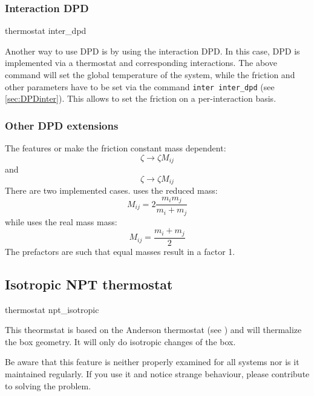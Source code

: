 \subsubsection{Interaction DPD}\label{sec:interDPD}

\begin{essyntax}
  thermostat inter_dpd 
  \begin{features}
  \end{features}
\end{essyntax}

Another way to use DPD is by using the interaction DPD. In this case,
DPD is implemented via a thermostat and corresponding interactions.
The above command will set the global temperature of the system, while
the friction and other parameters have to be set via the command
\texttt{inter inter_dpd} (see \vref{sec:DPDinter}).  This allows to
set the friction on a per-interaction basis.

\subsubsection{Other DPD extensions}
The features  or  make the
friction constant mass dependent:
$$ \zeta \to \zeta M_{ij} $$ 
and 
$$ \zeta \to \zeta M_{ij} $$
There are two implemented cases.  uses the
reduced mass:
$$ M_{ij}=2\frac{m_i m_j}{m_i+m_j} $$
while  uses the real mass mass:
$$ M_{ij}=\frac{m_i+m_j}{2} $$
The prefactors are such that equal masses result in a factor 1.

\subsection{Isotropic NPT thermostat}
\label{ssec:NPTthermostat}
\begin{essyntax}
  thermostat npt_isotropic   
  \begin{features}
  \end{features}
\end{essyntax}

This theormstat is based on the Anderson thermostat (see
\cite{andersen80a, mann05d}) and will thermalize the box geometry. It
will only do isotropic changes of the box.

Be aware that this feature is neither properly examined for all
systems nor is it maintained regularly. If you use it and notice
strange behaviour, please contribute to solving the problem.

